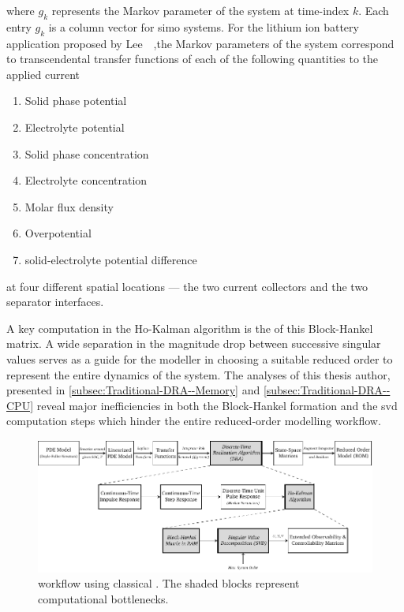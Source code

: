 where $g_k$ represents the  Markov parameter of the system at time-index $k$.
Each entry $g_k$ is a column vector for \gls{simo} systems. For the lithium ion
battery application proposed by Lee~\etal~\cite{Lee2012a},the Markov parameters of the system
correspond to transcendental transfer functions of each of the following quantities to
the applied current
\begin{enumerate}[itemsep=0pt]
    \item  Solid phase potential
    \item  Electrolyte potential
    \item  Solid phase concentration
    \item  Electrolyte concentration
    \item  Molar flux density
    \item  Overpotential 
    \item  solid-electrolyte potential difference
\end{enumerate}
at four different spatial locations --- the two current collectors and the two
separator interfaces.

A  key  computation  in  the  Ho-Kalman  algorithm  is the    of
this  Block-Hankel  matrix.  A  wide separation  in  the magnitude  drop
between  successive  singular  values serves  as  a  guide  for the  modeller in
choosing  a suitable  reduced order  to  represent the  entire dynamics  of  the
system.  The   analyses  of  this  thesis  author,  presented in
\cref{subsec:Traditional-DRA--Memory}  and \cref{subsec:Traditional-DRA--CPU}
reveal major inefficiencies in both the Block-Hankel formation and the \gls{svd}
computation steps which hinder the entire reduced-order modelling workflow.

\begin{figure}[!htbp]
    \centering
    \includegraphics[width=\textwidth]{traditional_dra.pdf}
    \caption[%
     workflow using the classical  scheme
    ]%
    {%
         workflow using classical
        . The shaded blocks represent computational bottlenecks.
    }%
    \label{fig:traditional_ROM_Workflow}
\end{figure}

